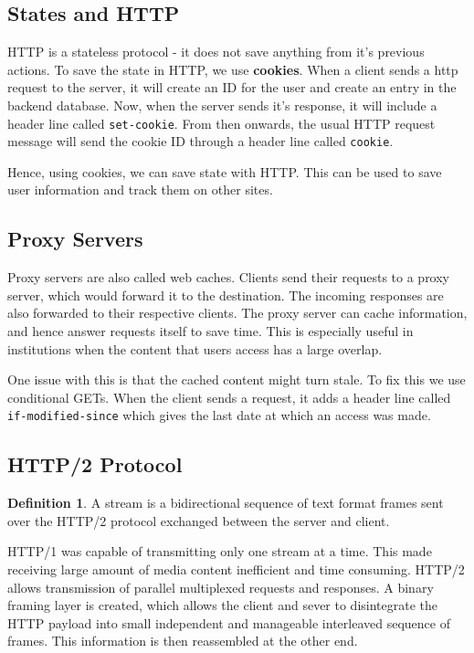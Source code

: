 \documentclass[12pt,letterpaper]{article}
\theoremstyle{definition}
\newtheorem{definition}{Definition}[section] %
\begin{document}
\subsection{States and HTTP}

HTTP is a stateless protocol - it does not save anything from it's previous actions. To save the state in HTTP, we use \textbf{cookies}. When a client sends a http request to the server, it will create an ID for the user and create an entry in the backend database. Now, when the server sends it's response, it will include a header line called \texttt{set-cookie}. From then onwards, the usual HTTP request message will send the cookie ID through a header line called \texttt{cookie}.

Hence, using cookies, we can save state with HTTP. This can be used to save user information and track them on other sites.

\subsection{Proxy Servers}

Proxy servers are also called web caches. Clients send their requests to a proxy server, which would forward it to the destination. The incoming responses are also forwarded to their respective clients. The proxy server can cache information, and hence answer requests itself to save time. This is especially useful in institutions when the content that users access has a large overlap.

One issue with this is that the cached content might turn stale. To fix this we use conditional GETs. When the client sends a request, it adds a header line called \texttt{if-modified-since} which gives the last date at which an access was made.

\subsection{HTTP/2 Protocol}

\begin{definition}
  A stream is a bidirectional sequence of text format frames sent over the HTTP/2 protocol exchanged between the server and client.  
\end{definition}

HTTP/1 was capable of transmitting only one stream at a time. This made receiving large amount of media content inefficient and time consuming. HTTP/2 allows transmission of parallel multiplexed requests and responses. A binary framing layer is created, which allows the client and sever to disintegrate the HTTP payload into small independent and manageable interleaved sequence of frames. This information is then reassembled at the other end.
\end{document}
